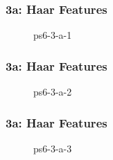 \documentclass[../report.tex]{subfiles}
\begin{document}
    \begin{frame}
        \frametitle{3a: Haar Features}
        \begin{figure}[!htb]
            \centering
            \caption{ps6-3-a-1}
        \end{figure}
    \end{frame}

    \begin{frame}
        \frametitle{3a: Haar Features}
        \begin{figure}[!htb]
            \centering
            \caption{ps6-3-a-2}
        \end{figure}
    \end{frame}

    \begin{frame}
        \frametitle{3a: Haar Features}
        \begin{figure}[!htb]
            \centering
            \caption{ps6-3-a-3}
        \end{figure}
    \end{frame}
\end{document}

